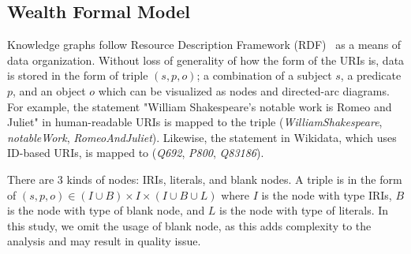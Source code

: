 \subsection{Wealth Formal Model} \label{wealth-formal-model}
Knowledge graphs follow Resource Description Framework (RDF)~\cite{w3crdf} as a means of data organization. Without loss of generality of how the form of the URIs is, data is stored in the form of triple \((s, p, o)\); a combination of a subject \(s\), a predicate \(p\), and an object \(o\) which can be visualized as nodes and directed-arc diagrams. For example, the statement "William Shakespeare's notable work is Romeo and Juliet" in human-readable URIs is mapped to the triple (\textit{WilliamShakespeare}, \textit{notableWork}, \textit{RomeoAndJuliet}). Likewise, the statement in Wikidata, which uses ID-based URIs, is mapped to (\textit{Q692}, \textit{P800}, \textit{Q83186}).

There are 3 kinds of nodes: IRIs, literals, and blank nodes. A triple is in the form of \((s, p, o) \in (I \cup B) \times I \times (I \cup B \cup L) \) where \(I\) is the node with type IRIs, \(B\) is the node with type of blank node, and \(L\) is the node with type of literals. In this study, we omit the usage of blank node, as this adds complexity to the analysis and may result in quality issue.


